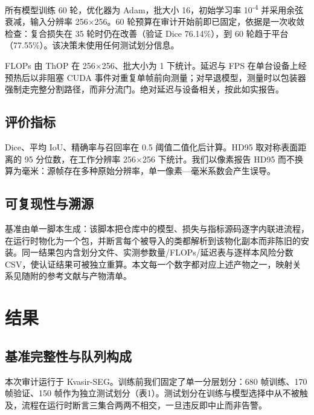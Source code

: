\documentclass[conference]{IEEEtran}
\begin{document}
所有模型训练 60 轮，优化器为 Adam，批大小 16，初始学习率 10\textsuperscript{-4} 并采用余弦衰减，输入分辨率 256$\times$256。60 轮预算在审计开始前即已固定，依据是一次收敛检查：复合损失在 35 轮时仍在改善（验证 Dice 76.14\%），到 60 轮趋于平台（77.55\%）。该决策未使用任何测试划分信息。

FLOPs 由 ThOP 在 256$\times$256、批大小为 1 下统计。延迟与 FPS 在单台设备上经预热后以非阻塞 CUDA 事件对重复单帧前向测量；对早退模型，测量时以包装器强制走完整分割路径，而非分流门。绝对延迟与设备相关，按此如实报告。

\subsection{评价指标}

Dice、平均 IoU、精确率与召回率在 0.5 阈值二值化后计算。HD95 取对称表面距离的 95 分位数，在工作分辨率 256$\times$256 下统计。我们以像素报告 HD95 而不换算为毫米：源帧存在多种原始分辨率，单一像素—毫米系数会产生误导。

\subsection{可复现性与溯源}

基准由单一脚本生成：该脚本把仓库中的模型、损失与指标源码逐字内联进流程，在运行时物化为一个包，并断言每个被导入的类都解析到该物化副本而非陈旧的安装。同一结果包内含划分文件、实测参数量/FLOPs/延迟表与逐样本风险分数 CSV，使认证结果可被独立重算。本文每一个数字都对应上述产物之一，映射关系见随附的参考文献与产物清单。

\section{结果}

\subsection{基准完整性与队列构成}

本次审计运行于 Kvasir-SEG。训练前我们固定了单一分层划分：680 帧训练、170 帧验证、150 帧作为独立测试划分（表1）。测试划分在训练与模型选择中从不被触及，流程在运行时断言三集合两两不相交，一旦违反即中止而非告警。
\end{document}

